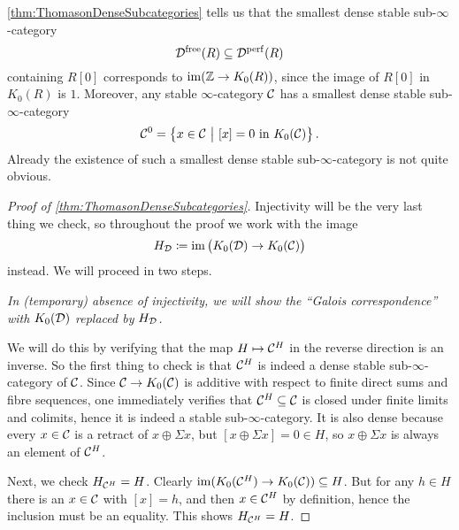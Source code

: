 \documentclass[a4paper, 10pt, oneside, DIV=9, chapterprefix=true, numbers=enddot,bibliography=totoc]{scrbook}
\newcommand{\embrace}[1]{\textup{(}#1\textup{)}}
\begin{document}
\cref{thm:ThomasonDenseSubcategories} tells us that the smallest dense stable sub-$\infty$-category
\begin{equation*}
	\mathcal{D}^\mathrm{free}(R)\subseteq \mathcal{D}^{\mathrm{perf}}(R)
\end{equation*}
containing $R[0]$ corresponds to $\im(\IZ\morphism K_0(R))$, since the image of $R[0]$ in $K_0(R)$ is $1$. Moreover, any stable $\infty$-category $\mathcal{C}$ has a smallest dense stable sub-$\infty$-category
\begin{equation*}
	\mathcal{C}^0=\big\{x\in\mathcal{C}\ \big|\ [x]=0\text{ in }K_0(\mathcal{C})\big\}\,.
\end{equation*}
Already the existence of such a smallest dense stable sub-$\infty$-category is not quite obvious.
\begin{proof}[Proof of \cref{thm:ThomasonDenseSubcategories}]
	Injectivity will be the very last thing we check, so throughout the proof we work with the image
	\begin{equation*}
		H_{\mathcal{D}}\coloneqq\operatorname{im}\big(K_0(\mathcal{D})\rightarrow K_0(\mathcal{C})\big) 
	\end{equation*}
	instead. We will proceed in two steps.
	\begin{alphanumerate}
		\item[\itememph{1}] \itshape In \embrace{temporary} absence of injectivity, we will show the \enquote{Galois correspondence} with $K_0(\mathcal{D})$ replaced by $H_{\mathcal{D}}$.
	\end{alphanumerate}
	
	We will do this by verifying that the map $H\mapsto \mathcal{C}^H$ in the reverse direction is an inverse. So the first thing to check is that $\mathcal{C}^H$ is indeed a dense stable sub-$\infty$-category of $\mathcal{C}$. Since $\Cc\morphism K_0(\Cc)$ is additive with respect to finite direct sums and fibre sequences, one immediately verifies that $\mathcal{C}^H\subseteq \mathcal{C}$ is closed under finite limits and colimits, hence it is indeed a stable sub-$\infty$-category. It is also dense because every $x\in \mathcal{C}$ is a retract of $x\oplus \Sigma x$, but $[x\oplus \Sigma x]=0\in H$, so $x\oplus \Sigma x$ is always an element of $\mathcal{C}^H$.
	
	Next, we check $H_{\mathcal{C}^H}=H$. Clearly $\im(K_0(\Cc^H)\morphism K_0(\Cc))\subseteq H$. But for any $h\in H$ there is an $x\in \mathcal{C}$ with $[x]=h$, and then $x\in \mathcal{C}^H$ by definition, hence the inclusion must be an equality. This shows $H_{\mathcal{C}^H}=H$.
	

\end{proof}
\end{document}
